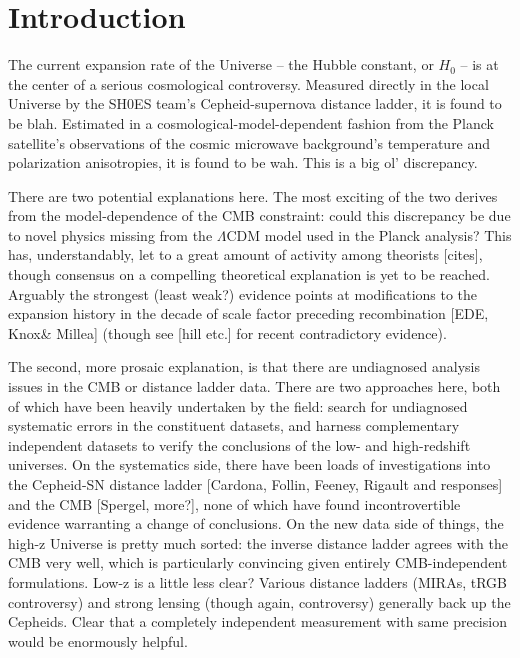 \documentclass[twocolumn]{aastex63}
\begin{document}
\section{Introduction} \label{sec:intro}


The current expansion rate of the Universe -- the Hubble constant, or $H_0$ -- is at the center of a serious cosmological controversy. Measured directly in the local Universe by the SH0ES team's Cepheid-supernova distance ladder, it is found to be blah. Estimated in a cosmological-model-dependent fashion from the Planck satellite's observations of the cosmic microwave background's temperature and polarization anisotropies, it is found to be wah. This is a big ol' discrepancy.

There are two potential explanations here. The most exciting of the two derives from the model-dependence of the CMB constraint: could this discrepancy be due to novel physics missing from the $\Lambda$CDM model used in the Planck analysis? This has, understandably, let to a great amount of activity among theorists [cites], though consensus on a compelling theoretical explanation is yet to be reached. Arguably the strongest (least weak?) evidence points at modifications to the expansion history in the decade of scale factor preceding recombination [EDE, Knox\& Millea] (though see [hill etc.] for recent contradictory evidence).

The second, more prosaic explanation, is that there are undiagnosed analysis issues in the CMB or distance ladder data. There are two approaches here, both of which have been heavily undertaken by the field: search for undiagnosed systematic errors in the constituent datasets, and harness complementary independent datasets to verify the conclusions of the low- and high-redshift universes. On the systematics side, there have been loads of investigations into the Cepheid-SN distance ladder [Cardona, Follin, Feeney, Rigault and responses] and the CMB [Spergel, more?], none of which have found incontrovertible evidence warranting a change of conclusions. On the new data side of things, the high-z Universe is pretty much sorted: the inverse distance ladder agrees with the CMB very well, which is particularly convincing given entirely CMB-independent formulations. Low-z is a little less clear? Various distance ladders (MIRAs, tRGB controversy) and strong lensing (though again, controversy) generally back up the Cepheids. Clear that a completely independent measurement with same precision would be enormously helpful.
\end{document}
